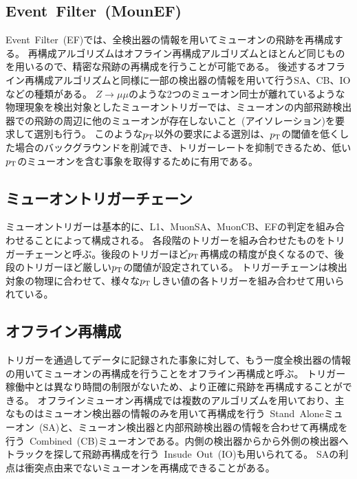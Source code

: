 \subsection{Event~Filter~(MounEF)}\label{chapter3-2-4}
Event~Filter~(EF)では、全検出器の情報を用いてミューオンの飛跡を再構成する。
再構成アルゴリズムはオフライン再構成アルゴリズムとほとんど同じものを用いるので、精密な飛跡の再構成を行うことが可能である。
後述するオフライン再構成アルゴリズムと同様に一部の検出器の情報を用いて行うSA、CB、IOなどの種類がある。
$Z\rightarrow\mu\mu$のような2つのミューオン同士が離れているような物理現象を検出対象としたミューオントリガーでは、ミューオンの内部飛跡検出器での飛跡の周辺に他のミューオンが存在しないこと~(アイソレーション)を要求して選別も行う。
このような$p_\mathrm{T}$以外の要求による選別は、$p_\mathrm{T}$の閾値を低くした場合のバックグラウンドを削減でき、トリガーレートを抑制できるため、低い$p_\mathrm{T}$のミューオンを含む事象を取得するために有用である。

\subsection{ミューオントリガーチェーン}\label{chapter3-2-5}
ミューオントリガーは基本的に、L1、MuonSA、MuonCB、EFの判定を組み合わせることによって構成される。
各段階のトリガーを組み合わせたものをトリガーチェーンと呼ぶ。後段のトリガーほど$p_\mathrm{T}$再構成の精度が良くなるので、後段のトリガーほど厳しい$p_\mathrm{T}$の閾値が設定されている。
トリガーチェーンは検出対象の物理に合わせて、様々な$p_\mathrm{T}$しきい値の各トリガーを組み合わせて用いられている。


\subsection{オフライン再構成}\label{chapter3-2-6}
トリガーを通過してデータに記録された事象に対して、もう一度全検出器の情報の用いてミューオンの再構成を行うことをオフライン再構成と呼ぶ。
トリガー稼働中とは異なり時間の制限がないため、より正確に飛跡を再構成することができる。
オフラインミューオン再構成では複数のアルゴリズムを用いており、主なものはミューオン検出器の情報のみを用いて再構成を行う~Stand~Aloneミューオン~(SA)と、ミューオン検出器と内部飛跡検出器の情報を合わせて再構成を行う~Combined~(CB)ミューオンである。内側の検出器からから外側の検出器へトラックを探して飛跡再構成を行う~Insude~Out~(IO)も用いられてる。
SAの利点は衝突点由来でないミューオンを再構成できることがある。


\newpage

